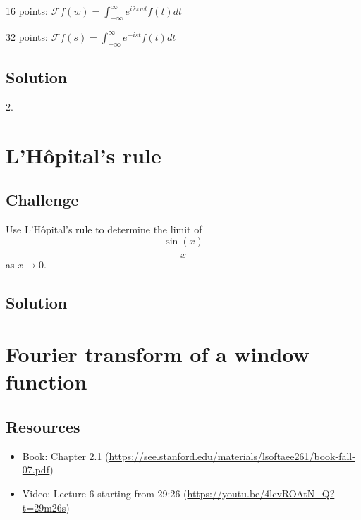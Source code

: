 16 points: $\displaystyle \mathcal{F}f(w)=\int_{-\infty}^{\infty} e^{i 2 \pi w t} f(t) dt$

32 points: $\displaystyle \mathcal{F}f(s)=\int_{-\infty}^{\infty} e^{-i s t} f(t) dt$

\subsection*{Solution}
2.\\




\newpage
\section{L'H\^opital's rule}

\subsection*{Challenge}
Use L'H\^opital's rule to determine the limit of
\begin{equation}
    \frac{\sin(x)}{x}
\end{equation}
as $x \rightarrow 0$.

\subsection*{Solution}




\newpage
\section{Fourier transform of a window function}
\label{sec:tophat}

\subsection*{Resources}
\begin{itemize}
    \item Book: Chapter 2.1 (\url{https://see.stanford.edu/materials/lsoftaee261/book-fall-07.pdf}) %
    \item Video: Lecture 6 starting from 29:26 (\url{https://youtu.be/4lcvROAtN_Q?t=29m26s})
\end{itemize}


